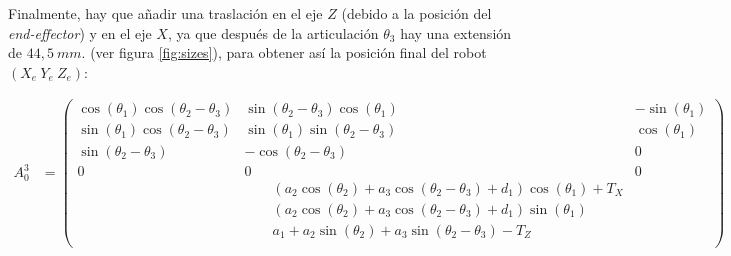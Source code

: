 \documentclass[a4paper,12pt]{article}
\begin{document}
Finalmente, hay que añadir una traslación en el eje $Z$ (debido a la posición del \textit{end-effector})
y en el eje $X$, ya que después de la articulación $\theta_3$ hay una extensión de $44,5~mm.$ (ver figura \ref{fig:sizes}),
para obtener así la posición final del robot $(X_e ~ Y_e ~ Z_e)$:

{\footnotesize\begin{align*}
    A_0^3 & =
    \begin{pmatrix}
        \cos{\left(\theta_{1} \right)} \cos{\left(\theta_{2} - \theta_{3} \right)} & \sin{\left(\theta_{2} - \theta_{3} \right)} \cos{\left(\theta_{1} \right)}                                                                                & - \sin{\left(\theta_{1} \right)} \\
        \sin{\left(\theta_{1} \right)} \cos{\left(\theta_{2} - \theta_{3} \right)} & \sin{\left(\theta_{1} \right)} \sin{\left(\theta_{2} - \theta_{3} \right)}                                                                                & \cos{\left(\theta_{1} \right)}   \\
        \sin{\left(\theta_{2} - \theta_{3} \right)}                                & - \cos{\left(\theta_{2} - \theta_{3} \right)}                                                                                                             & 0                                \\
        0                                                                          & 0                                                                                                                                                         & 0                                \\
                                                                                   & \qquad \left(a_{2} \cos{\left(\theta_{2} \right)} + a_{3} \cos{\left(\theta_{2} - \theta_{3} \right)} + d_{1}\right) \cos{\left(\theta_{1} \right)} + T_X                                    \\
                                                                                   & \qquad \left(a_{2} \cos{\left(\theta_{2} \right)} + a_{3} \cos{\left(\theta_{2} - \theta_{3} \right)} + d_{1}\right) \sin{\left(\theta_{1} \right)}                                          \\
                                                                                   & \qquad a_{1} + a_{2} \sin{\left(\theta_{2} \right)} + a_{3} \sin{\left(\theta_{2} - \theta_{3} \right)} - T_{Z}                                                                              \\

\end{pmatrix}
\end{align*}}
\end{document}
